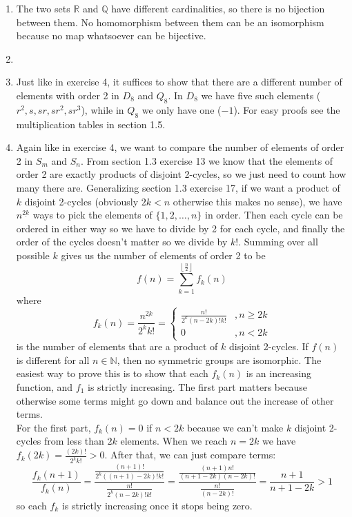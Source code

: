 \documentclass[]{article}
\newcommand{\bbq}{\mathbb{Q}}
\newcommand{\bbr}{\mathbb{R}}
\newcommand{\bbn}{\mathbb{N}}
\begin{document}
\begin{enumerate}
\item The two sets $\bbr$ and $\bbq$ have different cardinalities, so there is no bijection between them. No homomorphism between them can be an isomorphism because no map whatsoever can be bijective.


\item 


\item Just like in exercise 4, it suffices to show that there are a different number of elements with order 2 in $D_8$ and $Q_8$. In $D_8$ we have five such elements ($r^2, s, sr, sr^2, sr^3$), while in $Q_8$ we only have one ($-1$). For easy proofs see the multiplication tables in section 1.5.


\item Again like in exercise 4, we want to compare the number of elements of order 2 in $S_m$ and $S_n$. From section 1.3 exercise 13 we know that the elements of order 2 are exactly products of disjoint 2-cycles, so we just need to count how many there are. Generalizing section 1.3 exercise 17, if we want a product of $k$ disjoint 2-cycles (obviously $2k < n$ otherwise this makes no sense), we have $n^{\underline{2k}}$ ways to pick the elements of $\{1, 2, \ldots, n\}$ in order. Then each cycle can be ordered in either way so we have to divide by 2 for each cycle, and finally the order of the cycles doesn't matter so we divide by $k!$. Summing over all possible $k$ gives us the number of elements of order 2 to be
\begin{equation}
f(n) = \sum_{k=1}^{\left\lfloor\frac{n}{2}\right\rfloor} f_k(n)
\end{equation}
where
\begin{equation}
f_k(n) = \frac{n^{\underline{2k}}}{2^k k!} = \begin{cases}
\frac{n!}{2^k (n-2k)!k!} &, n\geq 2k\\
0 &, n<2k
\end{cases} \label{eq:1.4.8}
\end{equation}
is the number of elements that are a product of $k$ disjoint 2-cycles. If $f(n)$ is different for all $n \in \bbn$, then no symmetric groups are isomorphic. The easiest way to prove this is to show that each $f_k(n)$ is an increasing function, and $f_1$ is strictly increasing. The first part matters because otherwise some terms might go down and balance out the increase of other terms. \\

For the first part, $f_k(n) = 0$ if $n<2k$ because we can't make $k$ disjoint 2-cycles from less than $2k$ elements. When we reach $n=2k$ we have $f_k(2k) = \frac{(2k)!}{2^k k!} > 0$. After that, we can just compare terms:
\begin{equation}
\frac{f_k(n+1)}{f_k(n)} = \frac{\frac{(n+1)!}{2^k ((n+1)-2k)!k!}}{\frac{n!}{2^k (n-2k)!k!}} = \frac{\frac{(n+1)n!}{ (n+1-2k)(n-2k)!}}{\frac{n!}{(n-2k)!}} = \frac{n+1}{n+1-2k} > 1
\end{equation}
so each $f_k$ is strictly increasing once it stops being zero. \\


\end{enumerate}
\end{document}
